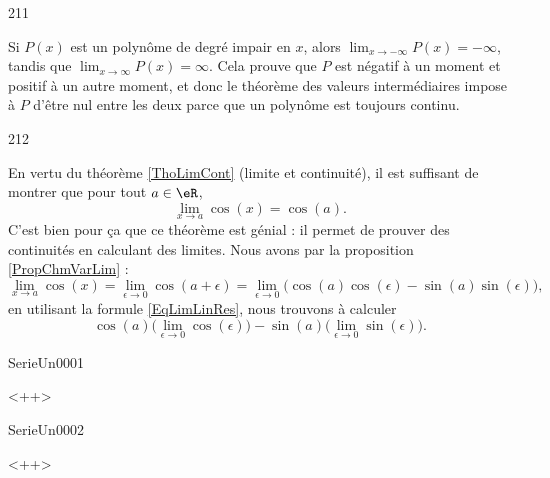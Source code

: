 \documentclass{article}
\begin{document}
\begin{corrige}{211}

Si $P(x)$ est un polynôme de degré impair en $x$, alors $\lim_{x\to-\infty}P(x)=-\infty$, tandis que $\lim_{x\to\infty}P(x)=\infty$. Cela prouve que $P$ est négatif à un moment et positif à un autre moment, et donc le théorème des valeurs intermédiaires impose à $P$ d'être nul entre les deux parce que un polynôme est toujours continu.

\end{corrige}


\begin{corrige}{212}

En vertu du théorème \ref{ThoLimCont}  (limite et continuité), il est suffisant de montrer que pour tout $a\in\eR$,
\[ 
  \lim_{x\to a}\cos(x)=\cos(a).
\]
C'est bien pour ça que ce théorème est génial : il permet de prouver des continuités en calculant des limites. Nous avons par la proposition \ref{PropChmVarLim} :
\begin{equation}
\lim_{x\to a}\cos(x)=\lim_{\epsilon\to 0}\cos(a+\epsilon)=\lim_{\epsilon\to0}\Big( \cos(a)\cos(\epsilon)-\sin(a)\sin(\epsilon) \Big),
\end{equation}
en utilisant la formule \eqref{EqLimLinRes}, nous trouvons à calculer
\[ 
  \cos(a)\Big(\lim_{\epsilon\to 0}\cos(\epsilon)\Big)-\sin(a)\Big( \lim_{\epsilon\to 0}\sin(\epsilon)\Big).
\]
\end{corrige}



\begin{corrige}{SerieUn0001}

<++>

\end{corrige}%


\begin{corrige}{SerieUn0002}

<++>

\end{corrige}%
\end{document}
